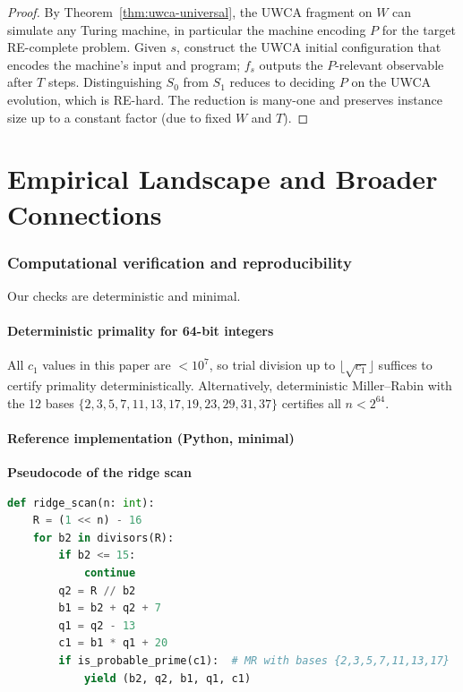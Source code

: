 \documentclass[12pt]{article}
\numberwithin{equation}{section}
\begin{document}
\begin{proof}
By Theorem~\ref{thm:uwca-universal}, the UWCA fragment on $W$ can simulate any Turing machine, in particular the machine encoding $P$ for the target RE-complete problem. Given $s$, construct the UWCA initial configuration that encodes the machine's input and program; $f_s$ outputs the $P$-relevant observable after $T$ steps. Distinguishing $S_0$ from $S_1$ reduces to deciding $P$ on the UWCA evolution, which is RE-hard. The reduction is many-one and preserves instance size up to a constant factor (due to fixed $W$ and $T$).
\end{proof}


\part{Empirical Landscape and Broader Connections}

\section{Computational verification and reproducibility}
Our checks are deterministic and minimal.

\subsection{Deterministic primality for 64-bit integers}
All $c_1$ values in this paper are $< 10^7$, so trial division up to $\lfloor \sqrt{c_1} \rfloor$ suffices to certify primality deterministically. Alternatively, deterministic Miller--Rabin with the 12 bases $\{2,3,5,7,11,13,17,19,23,29,31,37\}$ certifies all $n<2^{64}$.

\subsection{Reference implementation (Python, minimal)}
\vspace{0.3em}
\noindent\textbf{Pseudocode of the ridge scan}
\begin{lstlisting}[language=Python,basicstyle=\ttfamily\small\upshape]
def ridge_scan(n: int):
    R = (1 << n) - 16
    for b2 in divisors(R):
        if b2 <= 15: 
            continue
        q2 = R // b2
        b1 = b2 + q2 + 7
        q1 = q2 - 13
        c1 = b1 * q1 + 20
        if is_probable_prime(c1):  # MR with bases {2,3,5,7,11,13,17}
            yield (b2, q2, b1, q1, c1)
\end{lstlisting}
\end{document}
